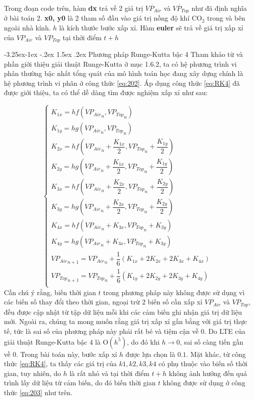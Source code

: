 \documentclass[a4paper]{article}
\makeatletter
\newcounter {subsubsubsection}[subsubsection]
\newcommand\subsubsubsection{\@startsection{subsubsubsection}{4}{\z@}%
                                     {-3.25ex\@plus -1ex \@minus -.2ex}%
                                     {1.5ex \@plus .2ex}%
                                     {\normalfont\normalsize\bfseries}}
\makeatother
\begin{document}
Trong đoạn code trên, hàm \textbf{dx} trả về 2 giá trị $\dot{VP_{Air}}$ và $\dot{VP_{Top}}$ như đã định nghĩa ở bài toán 2. \textbf{x0, y0} là 2 tham số đầu vào giá trị nồng độ khí $\mathrm{CO_{2}}$ trong và bên ngoài nhà kính. \textbf{$h$} là kích thước bước xấp xỉ. Hàm \textbf{euler} sẽ trả về giá trị xấp xỉ của $VP_{Air}$ và $VP_{Top}$ tại thởi điểm $t+h$ \par

\subsubsubsection{Phương pháp Runge-Kutta bậc 4}
Tham khảo từ \cite{EG96} và phần giới thiệu giải thuật Runge-Kutta ở mục 1.6.2, ta có hệ phương trình vi phân thường bậc nhất tổng quát của mô hình toán học đang xây dựng chính là hệ phương trình vi phân ở công thức \eqref{eq:202}. Áp dụng công thức \eqref{eq:RK4} đã được giới thiệu, ta có thể dễ dàng tìm được nghiệm xấp xỉ như sau:

\begin{equation}
\begin{cases}
    K_{1x} = hf({VP_{Air}}_n, {VP_{Top}}_n) \\
    K_{1y} = hg({VP_{Air}}_n, {VP_{Top}}_n) \\
    K_{2x} = hf \left ({VP_{Air}}_n + \dfrac{K_{1x}}{2}, {VP_{Top}}_n + \dfrac{K_{1y}}{2} \right ) \\
    K_{2y} = hg \left ({VP_{Air}}_n + \dfrac{K_{1x}}{2}, {VP_{Top}}_n + \dfrac{K_{1y}}{2} \right ) \\
    K_{3x} = hf \left ({VP_{Air}}_n + \dfrac{K_{2x}}{2}, {VP_{Top}}_n + \dfrac{K_{2y}}{2} \right ) \\
    K_{3y} = hg \left ({VP_{Air}}_n + \dfrac{K_{2x}}{2}, {VP_{Top}}_n + \dfrac{K_{2y}}{2} \right ) \\
    K_{4x} = hf({VP_{Air}}_n + K_{3x}, {VP_{Top}}_n + K_{3y}) \\
    K_{4y} = hg({VP_{Air}}_n + K_{3x}, {VP_{Top}}_n + K_{3y}) \\
    {VP_{Air}}_{n+1} = {VP_{Air}}_n + \dfrac{1}{6}(K_{1x} + 2K_{2x} + 2K_{3x} + K_{4x}) \\ 
    {VP_{Top}}_{n+1} = {VP_{Top}}_n + \dfrac{1}{6}(K_{1y} + 2K_{2y} + 2K_{3y} + K_{4y}) \\
\end{cases}
\end{equation}
Cần chú ý rằng, biến thời gian $t$ trong phương pháp này không được sử dụng vì các biến số thay đổi theo thời gian, ngoại trừ 2 biến số cần xấp xỉ $VP_{Air}$ và $VP_{Top}$, đều được cập nhật từ tập dữ liệu mỗi khi các cảm biến ghi nhận giá trị dữ liệu mới. Ngoài ra, chúng ta mong muốn rằng giá trị xấp xỉ gần bằng với giá trị thực tế, tức là sai số của phương pháp này phải rất bé và tiệm cận về 0. Do LTE của giải thuật Runge-Kutta bậc 4 là $\mathrm{O}(h^5)$, do đó khi $h \rightarrow 0$, sai số càng tiến gần về 0. Trong bài toán này, bước xấp xỉ $h$ được lựa chọn là $0.1$. Mặt khác, từ công thức \ref{eq:RK4}, ta thấy các giá trị của $k1, k2, k3, k4$ có phụ thuộc vào biến số thời gian, tuy nhiên, do $h$ là rất nhỏ và tại thời điểm $t+h$ không ảnh hưởng đến quá trình lấy dữ liệu từ cảm biến, do đó biến thời gian $t$ không được sử dụng ở công thức \eqref{eq:203} như trên. \par
\end{document}
